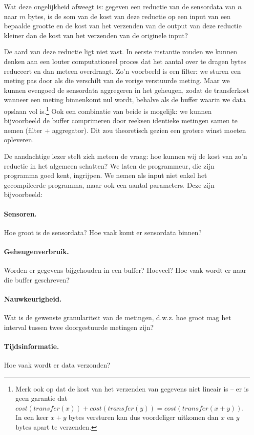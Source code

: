 \documentclass{article}
\begin{document}
Wat deze ongelijkheid afweegt is: gegeven een reductie van de sensordata van $n$ naar
$m$ bytes, is de som van de kost van deze reductie op een input van een bepaalde
grootte en de kost van het verzenden van de output van deze reductie kleiner dan
de kost van het verzenden van de originele input?

De aard van deze reductie ligt niet vast. In eerste instantie zouden we kunnen
denken aan een louter computationeel proces dat het aantal over te dragen bytes
reduceert en dan meteen overdraagt. Zo'n voorbeeld is een filter: we sturen een
meting pas door als die verschilt van de vorige verstuurde meting. Maar we
kunnen evengoed de sensordata aggregeren in het geheugen, zodat de transferkost
wanneer een meting binnenkomt nul wordt, behalve als de buffer waarin we data
opslaan vol is.\footnote{Merk ook op dat de kost van het verzenden van gegevens
niet lineair is -- er is geen garantie dat $cost(transfer(x)) +
cost(transfer(y)) = cost(transfer(x + y))$. In een keer $x + y$ bytes versturen
kan dus voordeliger uitkomen dan $x$ en $y$ bytes apart te verzenden.} 
Ook een combinatie van beide is mogelijk: we kunnen bijvoorbeeld de buffer
comprimeren door reeksen identieke metingen samen te nemen (filter +
aggregator). Dit zou theoretisch gezien een grotere winst moeten opleveren.

De aandachtige lezer stelt zich meteen de vraag: hoe kunnen wij de kost van zo'n
reductie in het algemeen schatten? We laten de programmeur, die zijn programma
goed kent, ingrijpen. We nemen als input niet enkel het gecompileerde programma,
maar ook een aantal parameters. Deze zijn bijvoorbeeld:

\paragraph{Sensoren.} Hoe groot is de sensordata? Hoe vaak komt er sensordata binnen?
\paragraph{Geheugenverbruik.} Worden er gegevens bijgehouden in een buffer? Hoeveel? Hoe vaak wordt er naar die buffer geschreven?
\paragraph{Nauwkeurigheid.} Wat is de gewenste granulariteit van de metingen,
d.w.z. hoe groot mag het interval tussen twee doorgestuurde metingen zijn?
\paragraph{Tijdsinformatie.} Hoe vaak wordt er data verzonden?
\end{document}
